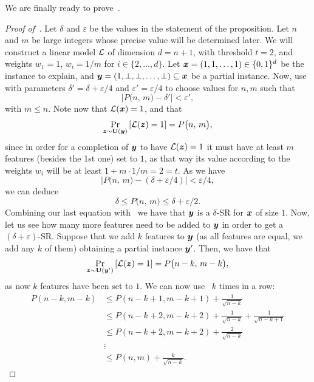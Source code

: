 We are finally ready to prove~.
\begin{proof}[Proof of~]
Let $\delta$ and $\varepsilon$ be the values in the statement of the proposition. 
Let $n$ and $m$ be large integers whose precise value will be determined later. We will construct a linear model $\mathcal{L}$ of dimension $d = n+1$, with threshold $t = 2$, and weights $w_1 = 1$, $w_i = 1/m$ for $i \in \{2, \ldots, d\}$. 
Let ${\bm{x}} = (1, 1, \ldots, 1) \in \{0, 1\}^d$ be the instance to explain, and ${\bm{y}} = (1, \bot, \bot, \ldots, \bot) \subseteq {\bm{x}}$ be a partial instance.
Now, use~ with parameters $\delta' = \delta + \varepsilon/4$ and $\varepsilon' = \varepsilon/4$ to choose values for $n, m$ such that 
\[ \left|P\big(n,\, m\big) - \delta'\right| < \varepsilon', \]
 with $m \leq n$. Note now that $\mathcal{L}({\bm{x}}) = 1$, and that
 \begin{equation}\label{eq:prob-lin}
    \Pr_{{\bm{z}} \sim \mathbf{U}({\bm{y}})}\left[\mathcal{L}({\bm{z}}) = 1\right] = P\big(n,\, m\big),
 \end{equation}
 since in order for a completion of ${\bm{y}}$ to have $\mathcal{L}({\bm{z}}) = 1$ it must have at least $m$ features (besides the 1st one) set to $1$, as that way its value according to the weights $w_i$ will be at least $1 + m \cdot 1/m = 2 = t$.
 As we have 
 \[ 
    \left|P\big(n,\, m\big) - (\delta+ \varepsilon/4) \right| < \varepsilon/4, 
 \]
 we can deduce 
 \[ 
    \delta \leq P\big(n,\, m\big) \leq \delta + \varepsilon/2.
 \]
 Combining our last equation with~ we have that ${\bm{y}}$ is a $\delta$-SR for ${\bm{x}}$ of size $1$.
 Now, let us see how many more features need to be added to ${\bm{y}}$ in order to get a $(\delta+\varepsilon)$-SR.
 Suppose that we add $k$ features to ${\bm{y}}$ (as all features are equal, we add any $k$ of them) obtaining a partial instance ${\bm{y}}'$. Then, we have that 
 \[ 
    \Pr_{{\bm{z}} \sim \mathbf{U}({\bm{y}}')}\left[\mathcal{L}({\bm{z}}) = 1\right] = P\big(n - k,\, m - k\big),
 \]
 as now $k$ features have been set to $1$. We can now use~ $k$ times in a row:
 \begin{align*}
    P(n-k, m - k) &\leq P(n-k+1, m - k+1) + \frac{1}{\sqrt{n-k}}\\
    &\leq P(n-k+2, m - k+2) + \frac{1}{\sqrt{n-k}} + \frac{1}{\sqrt{n-k+1}}\\
    & \leq P(n-k+2, m - k+2) + \frac{2}{\sqrt{n-k}}\\
    & \vdots\\
    & \leq P(n, m) + \frac{k}{\sqrt{n-k}}.
 \end{align*}


\end{proof}
